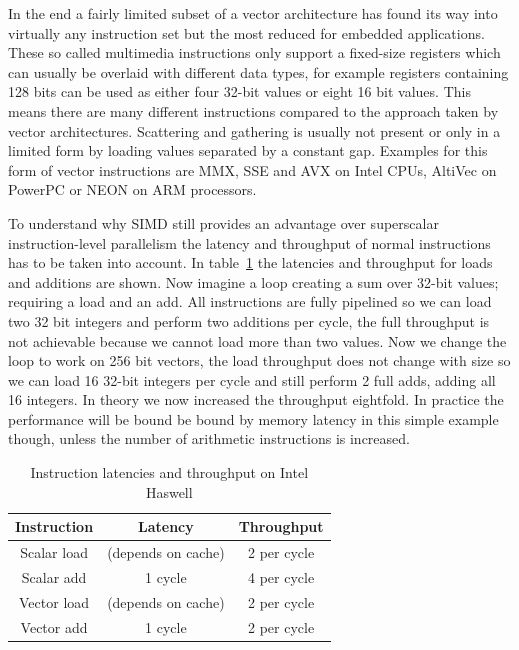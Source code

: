 In the end a fairly limited subset of a vector architecture has found its way
into virtually any instruction set but the most reduced for embedded
applications. These so called multimedia instructions only support a fixed-size
registers which can usually be overlaid with different data types, for example
registers containing 128 bits can be used as either four 32-bit values or eight
16 bit values. This means there are many different instructions compared to the
approach taken by vector architectures. Scattering and gathering is usually not
present or only in a limited form by loading values separated by a constant gap.
Examples for this form of vector instructions are MMX, SSE and AVX on Intel
CPUs, AltiVec on PowerPC or NEON on ARM processors.

To understand why SIMD still provides an advantage over superscalar
instruction-level parallelism the latency and throughput of normal instructions
has to be taken into account. In table~\ref{tab:latencies} the latencies and
throughput for loads and additions are shown. Now imagine a loop creating a sum
over 32-bit values; requiring a load and an add. All instructions are fully
pipelined so we can load two 32 bit integers and perform two additions per
cycle, the full throughput is not achievable because we cannot load more than
two values. Now we change the loop to work on 256 bit vectors, the load
throughput does not change with size so we can load 16 32-bit integers per cycle
and still perform 2 full adds, adding all 16 integers. In theory we now
increased the throughput eightfold. In practice the performance will be bound be
bound by memory latency in this simple example though, unless the number of
arithmetic instructions is increased.

\begin{table}\center
\begin{tabular}{c|c|c}
Instruction & Latency & Throughput\\
\hline
Scalar load & (depends on cache) & 2 per cycle\\
Scalar add & 1 cycle & 4 per cycle\\
Vector load & (depends on cache) & 2 per cycle\\
Vector add & 1 cycle & 2 per cycle\\
\end{tabular}
\caption{Instruction latencies and throughput on Intel Haswell}
\label{tab:latencies}
\end{table}

